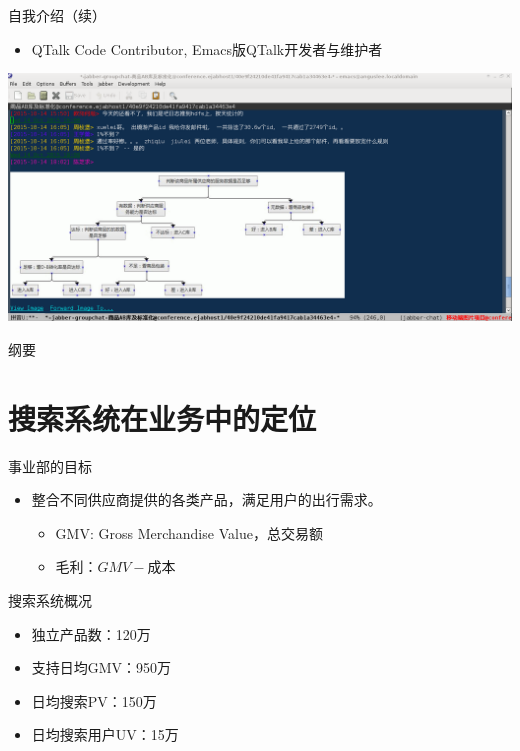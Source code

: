 \documentclass{beamer}
\begin{document}
\begin{CJK}{UTF8}{gbsn}
\begin{frame}{自我介绍（续）}
  \begin{itemize}
  \item {QTalk Code Contributor, Emacs版QTalk开发者与维护者}
  \end{itemize}
  \begin{center}
    \includegraphics[scale=0.3]{./images/qtalk-emacs-screenshot}
  \end{center}
\end{frame}

\begin{frame}{纲要}
  \tableofcontents
\end{frame}

\section{搜索系统在业务中的定位}


\begin{frame}{事业部的目标}
  \begin{itemize}
  \item { 整合不同供应商提供的各类产品，满足用户的出行需求。
    \begin{itemize}
      \item<2-> { GMV: Gross Merchandise Value，总交易额 }
      \item<2-> { 毛利：$GMV - \text{成本} $ }
    \end{itemize}
  }
  \end{itemize}
\end{frame}

\begin{frame}{搜索系统概况}
  \begin{itemize}
  \item { 独立产品数：120万 }
  \item { 支持日均GMV：950万 }
  \item { 日均搜索PV：150万 }
  \item { 日均搜索用户UV：15万 }
  \end{itemize}
\end{frame}



\end{CJK}
\end{document}

